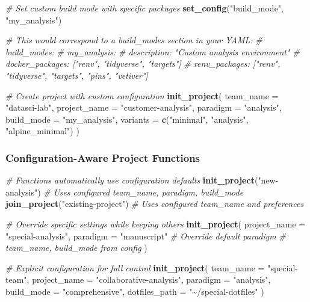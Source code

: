 \documentclass[
]{article}
\newenvironment{Shaded}{\begin{snugshade}}{\end{snugshade}}
\newcommand{\AttributeTok}[1]{\textcolor[rgb]{0.13,0.29,0.53}{#1}}
\newcommand{\CommentTok}[1]{\textcolor[rgb]{0.56,0.35,0.01}{\textit{#1}}}
\newcommand{\FunctionTok}[1]{\textcolor[rgb]{0.13,0.29,0.53}{\textbf{#1}}}
\newcommand{\NormalTok}[1]{#1}
\newcommand{\StringTok}[1]{\textcolor[rgb]{0.31,0.60,0.02}{#1}}
\begin{document}
\begin{Shaded}
\begin{Highlighting}[]
\CommentTok{\# Set custom build mode with specific packages}
\FunctionTok{set\_config}\NormalTok{(}\StringTok{"build\_mode"}\NormalTok{, }\StringTok{"my\_analysis"}\NormalTok{)}

\CommentTok{\# This would correspond to a build\_modes section in your YAML:}
\CommentTok{\# build\_modes:}
\CommentTok{\#   my\_analysis:}
\CommentTok{\#     description: "Custom analysis environment"}
\CommentTok{\#     docker\_packages: ["renv", "tidyverse", "targets"]}
\CommentTok{\#     renv\_packages: ["renv", "tidyverse", "targets", "pins", "vetiver"]}

\CommentTok{\# Create project with custom configuration}
\FunctionTok{init\_project}\NormalTok{(}
  \AttributeTok{team\_name =} \StringTok{"datasci{-}lab"}\NormalTok{,}
  \AttributeTok{project\_name =} \StringTok{"customer{-}analysis"}\NormalTok{,}
  \AttributeTok{paradigm =} \StringTok{"analysis"}\NormalTok{,}
  \AttributeTok{build\_mode =} \StringTok{"my\_analysis"}\NormalTok{,}
  \AttributeTok{variants =} \FunctionTok{c}\NormalTok{(}\StringTok{"minimal"}\NormalTok{, }\StringTok{"analysis"}\NormalTok{, }\StringTok{"alpine\_minimal"}\NormalTok{)}
\NormalTok{)}
\end{Highlighting}
\end{Shaded}

\subsubsection{Configuration-Aware Project
Functions}\label{configuration-aware-project-functions}

\begin{Shaded}
\begin{Highlighting}[]
\CommentTok{\# Functions automatically use configuration defaults}
\FunctionTok{init\_project}\NormalTok{(}\StringTok{"new{-}analysis"}\NormalTok{)          }\CommentTok{\# Uses configured team\_name, paradigm, build\_mode}
\FunctionTok{join\_project}\NormalTok{(}\StringTok{"existing{-}project"}\NormalTok{)      }\CommentTok{\# Uses configured team\_name and preferences}

\CommentTok{\# Override specific settings while keeping others}
\FunctionTok{init\_project}\NormalTok{(}
  \AttributeTok{project\_name =} \StringTok{"special{-}analysis"}\NormalTok{,}
  \AttributeTok{paradigm =} \StringTok{"manuscript"}             \CommentTok{\# Override default paradigm}
  \CommentTok{\# team\_name, build\_mode from config}
\NormalTok{)}

\CommentTok{\# Explicit configuration for full control}
\FunctionTok{init\_project}\NormalTok{(}
  \AttributeTok{team\_name =} \StringTok{"special{-}team"}\NormalTok{,}
  \AttributeTok{project\_name =} \StringTok{"collaborative{-}analysis"}\NormalTok{,}
  \AttributeTok{paradigm =} \StringTok{"analysis"}\NormalTok{,}
  \AttributeTok{build\_mode =} \StringTok{"comprehensive"}\NormalTok{,}
  \AttributeTok{dotfiles\_path =} \StringTok{"\textasciitilde{}/special{-}dotfiles"}
\NormalTok{)}
\end{Highlighting}
\end{Shaded}
\end{document}
